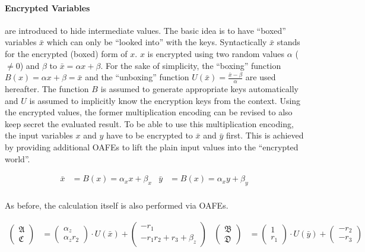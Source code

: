 \paragraph{Encrypted Variables} are introduced to hide intermediate values. The
basic idea is to have ``boxed'' variables $\bar{x}$ which can only be ``looked
into'' with the keys. Syntactically $\bar{x}$ stands for the encrypted (boxed)
form of $x$. $x$ is encrypted using two random values $\alpha$ ($\neq 0$) and
$\beta$ to $\bar{x} = \alpha x + \beta$.  For the sake of simplicity, the
``boxing'' function $B(x) = \alpha x + \beta = \bar{x}$ and the ``unboxing''
function $U(\bar{x}) = \frac{\bar{x}-\beta}{\alpha}$ are used hereafter.  The
function $B$ is assumed to generate appropriate keys automatically and $U$ is
assumed to implicitly know the encryption keys from the context. Using the
encrypted values, the former multiplication encoding can be revised to also keep
secret the evaluated result. To be able to use this multiplication encoding, the
input variables $x$ and $y$ have to be encrypted to $\bar{x}$ and $\bar{y}$
first. This is achieved by providing additional OAFEs to lift the plain input
values into the ``encrypted world''.

\begin{align*}
  \bar{x} & = B(x) = \alpha_x x + \beta_x &
  \bar{y} & = B(x) = \alpha_x y + \beta_y \\
\end{align*}

\noindent{}As before, the calculation itself is also performed via OAFEs.

\begin{align*}
\begin{pmatrix}\mathfrak{A}\\\mathfrak{C}\end{pmatrix} & =
\begin{pmatrix}\alpha_z\\\alpha_z r_2\end{pmatrix} \cdot U(\bar{x}) +
\begin{pmatrix}-r_1\\-r_1r_2+r_3+\beta_z\end{pmatrix} &
\begin{pmatrix}\mathfrak{B}\\\mathfrak{D}\end{pmatrix} & =
\begin{pmatrix}1\\r_1\end{pmatrix} \cdot U(\bar{y}) +
\begin{pmatrix}-r_2\\-r_3\end{pmatrix}\\
\end{align*}

